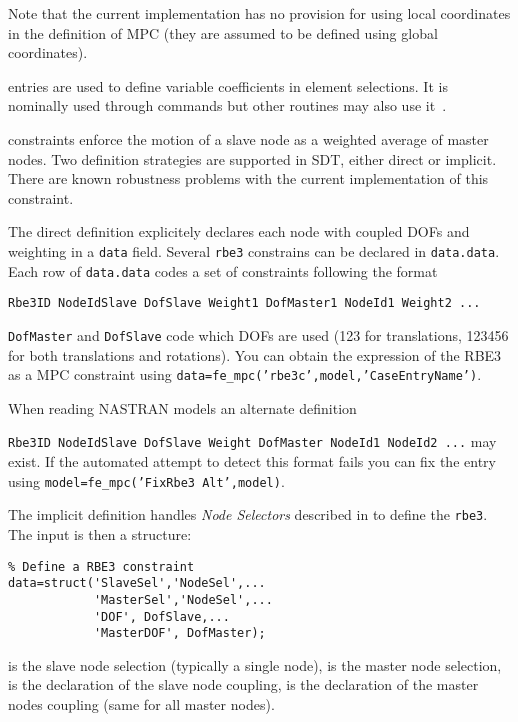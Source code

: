 Note that the current implementation has no provision for using local coordinates in the definition of MPC (they are assumed to be defined using global coordinates).


 entries are used to define variable coefficients in element selections. It is nominally used through  commands but other routines may also use it~\cite{bal43}.


 constraints enforce the motion of a slave node as a weighted average of master nodes. Two definition strategies are supported in SDT, either direct or implicit. There are known robustness problems with the current implementation of this constraint.

The direct definition explicitely declares each node with coupled DOFs and weighting in a {\tt data} field. Several {\tt rbe3} constrains can be declared in {\tt data.data}. Each row of {\tt data.data} codes a set of constraints following the format

{\tt Rbe3ID NodeIdSlave DofSlave Weight1 DofMaster1 NodeId1 Weight2 ...}

{\tt DofMaster} and {\tt DofSlave} code which DOFs are used (123 for translations, 123456 for both translations and rotations). You can obtain the expression of the RBE3 as a MPC constraint using {\tt data=fe\_mpc('rbe3c',model,'CaseEntryName')}. 

When reading NASTRAN models an alternate definition 

{\tt Rbe3ID NodeIdSlave DofSlave Weight DofMaster NodeId1 NodeId2 ...}
%
may exist. If the automated attempt to detect this format fails you can fix the entry using {\tt model=fe\_mpc('FixRbe3 Alt',model)}. 


The implicit definition handles {\it Node Selectors} described in  to define the {\tt rbe3}. The input is then a structure:

\begin{verbatim}
% Define a RBE3 constraint
data=struct('SlaveSel','NodeSel',...
            'MasterSel','NodeSel',...
            'DOF', DofSlave,...
            'MasterDOF', DofMaster);
\end{verbatim}

 is the slave node selection (typically a single node),  is the master node selection,  is the declaration of the slave node coupling,  is the declaration of the master nodes coupling (same for all master nodes).

